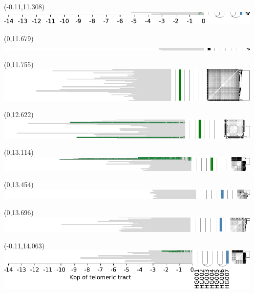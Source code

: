 \documentclass{article}
\begin{document}
\begin{textblock}{13}(-0.11,11.308)\includegraphics{./Figure_S4/chr12-HG007.pdf}\end{textblock}
\begin{textblock}{13}(0,11.679)\includegraphics{./Figure_S4/17ptel_1_500K_1_12_12-HG001.pdf}\end{textblock}
\begin{textblock}{13}(0,11.755)\includegraphics{./Figure_S4/17ptel_1_500K_1_12_12-HG002.pdf}\end{textblock}
\begin{textblock}{13}(0,12.622)\includegraphics{./Figure_S4/17ptel_1_500K_1_12_12-HG003.pdf}\end{textblock}
\begin{textblock}{13}(0,13.114)\includegraphics{./Figure_S4/17ptel_1_500K_1_12_12-HG004.pdf}\end{textblock}
\begin{textblock}{13}(0,13.454)\includegraphics{./Figure_S4/17ptel_1_500K_1_12_12-HG005.pdf}\end{textblock}
\begin{textblock}{13}(0,13.696)\includegraphics{./Figure_S4/17ptel_1_500K_1_12_12-HG006.pdf}\end{textblock}
\begin{textblock}{13}(-0.11,14.063)\includegraphics{./Figure_S4/17ptel_1_500K_1_12_12-HG007.pdf}\end{textblock}
\end{document}
